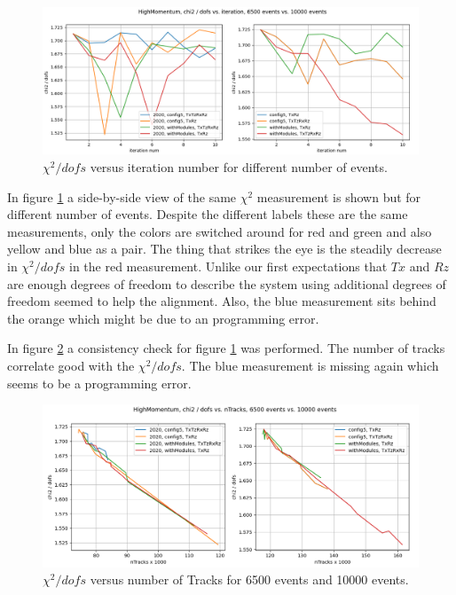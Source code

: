 \begin{figure}
  \centering
  \includegraphics[width=\textwidth]{plots/LHCB_week_dec/chi2_vs_iter_normal.png}
  \caption{$\chi^2 / dofs$ versus iteration number for different number of events.}
  \label{fig:chi2iterdec}
\end{figure}

In figure \ref{fig:chi2iterdec} a side-by-side view of the same $\chi^2$ measurement
is shown but for different number of events. Despite the different labels these are the same measurements, only the colors are switched around for red and green and also yellow and blue as a pair. The thing that strikes the eye is the steadily decrease in $\chi^2 / dofs$ in the red measurement. Unlike our first expectations that $Tx$ and $Rz$ are enough degrees of freedom to describe the system using additional degrees of freedom seemed to help the alignment.
Also, the blue measurement sits behind the orange which might be due to an
programming error.

In figure \ref{fig:chi2tracksdec} a consistency check for figure
\ref{fig:chi2iterdec} was performed. The number of tracks correlate good with
the $\chi^2 / dofs$. The blue measurement is missing again which seems to be a
programming error.

\begin{figure}
  \centering
  \includegraphics[width=\textwidth]{plots/LHCB_week_dec/chi2_vs_tracks_normal.png}
  \caption{$\chi^2 / dofs$ versus number of Tracks for 6500 events and 10000 events.}
  \label{fig:chi2tracksdec}
\end{figure}

